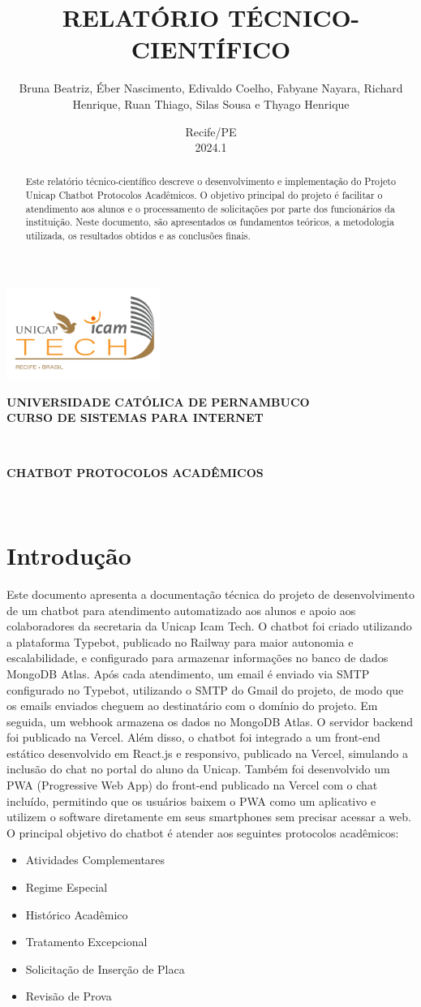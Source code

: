 \documentclass[12pt,a4paper]{article} %
\title{\textbf{\MakeUppercase{Relatório Técnico-Científico}}}
\author{Bruna Beatriz, Éber Nascimento, Edivaldo Coelho, Fabyane Nayara, Richard Henrique, Ruan Thiago, Silas Sousa e Thyago Henrique}
\date{Recife/PE \\ 2024.1}
\renewcommand{\maketitle}{\begin{titlepage}
\begin{center}
\includegraphics[width=5cm]{img/Unicap_Icam_Tech-01.png} \\ %
\vspace*{1cm}

\textbf{\Large\scshape UNIVERSIDADE CATÓLICA DE PERNAMBUCO} \\
\vspace*{0.5cm}
\textbf{\Large\scshape CURSO DE SISTEMAS PARA INTERNET} \\
\vspace*{2cm}

\textbf{\fontsize{18pt}{\baselineskip}\selectfont \MakeUppercase{\thetitle}} \\

\vspace*{0.5cm}

\textbf{\fontsize{14pt}{\baselineskip}\selectfont \MakeUppercase{Chatbot Protocolos Acadêmicos}} \\

\vspace*{2cm}

\textbf{\fontsize{14pt}{\baselineskip}\selectfont \MakeUppercase{\theauthor}} \\

\vfill

\textbf{\Large\MakeUppercase{\thedate}}

\end{center}
\end{titlepage}}
\begin{document}
\maketitle

\newpage

\begin{abstract}
\noindent Este relatório técnico-científico descreve o desenvolvimento e implementação do Projeto Unicap Chatbot Protocolos Acadêmicos. O objetivo principal do projeto é facilitar o atendimento aos alunos e o processamento de solicitações por parte dos funcionários da instituição. Neste documento, são apresentados os fundamentos teóricos, a metodologia utilizada, os resultados obtidos e as conclusões finais.
\end{abstract}

\newpage

\tableofcontents

\newpage

\section{Introdução}

\noindent Este documento apresenta a documentação técnica do projeto de desenvolvimento de um chatbot para atendimento automatizado aos alunos e apoio aos colaboradores da secretaria da Unicap Icam Tech. O chatbot foi criado utilizando a plataforma Typebot, publicado no Railway para maior autonomia e escalabilidade, e configurado para armazenar informações no banco de dados MongoDB Atlas. Após cada atendimento, um email é enviado via SMTP configurado no Typebot, utilizando o SMTP do Gmail do projeto, de modo que os emails enviados cheguem ao destinatário com o domínio do projeto. Em seguida, um webhook armazena os dados no MongoDB Atlas. O servidor backend foi publicado na Vercel. Além disso, o chatbot foi integrado a um front-end estático desenvolvido em React.js e responsivo, publicado na Vercel, simulando a inclusão do chat no portal do aluno da Unicap. Também foi desenvolvido um PWA (Progressive Web App) do front-end publicado na Vercel com o chat incluído, permitindo que os usuários baixem o PWA como um aplicativo e utilizem o software diretamente em seus smartphones sem precisar acessar a web. O principal objetivo do chatbot é atender aos seguintes protocolos acadêmicos:

\begin{itemize}
    \item Atividades Complementares
    \item Regime Especial
    \item Histórico Acadêmico
    \item Tratamento Excepcional
    \item Solicitação de Inserção de Placa
    \item Revisão de Prova
\end{itemize}
\end{document}
